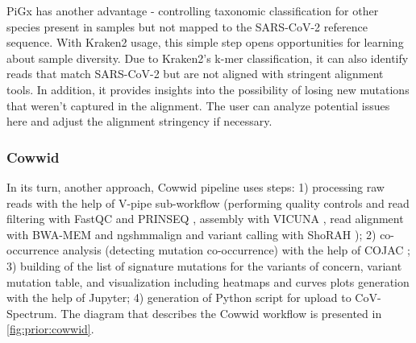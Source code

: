         PiGx has another advantage - controlling taxonomic classification for other species present in samples but not mapped to the SARS-CoV-2 reference sequence. With Kraken2 usage, this simple step opens opportunities for learning about sample diversity. Due to Kraken2's k-mer classification, it can also identify reads that match SARS-CoV-2 but are not aligned with stringent alignment tools. In addition, it provides insights into the possibility of losing new mutations that weren't captured in the alignment. The user can analyze potential issues here and adjust the alignment stringency if necessary.

        \subsubsection{Cowwid}
        In its turn, another approach, Cowwid \cite{jahn2021} pipeline uses steps: 1) processing raw reads with the help of V-pipe \cite{posada2021} sub-workflow (performing quality controls and read filtering with FastQC and PRINSEQ \cite{babraham,prinseq}, assembly with VICUNA \cite{vicuna2012}, read alignment with BWA-MEM and ngshmmalign \cite{li2013,ngshmmalign2021} and variant calling with ShoRAH \cite{shorah}); 2) co-occurrence analysis (detecting mutation co-occurrence) with the help of COJAC \cite{jahn2022,cojac2022}; 3) building of the list of signature mutations for the variants of concern, variant mutation table, and visualization including heatmaps and curves plots generation with the help of Jupyter; 4) generation of Python script for upload to CoV-Spectrum. The diagram that describes the Cowwid workflow is presented in \cref{fig:prior:cowwid}.
        
